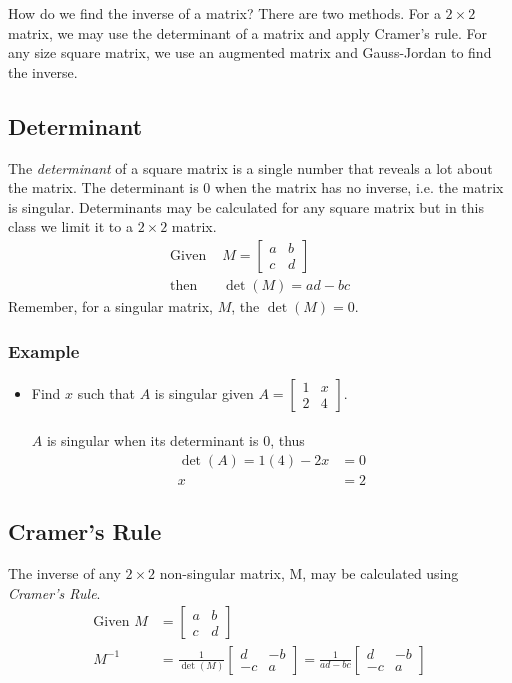 \documentclass[14pt]{extarticle}
\begin{document}
How do we find the inverse of a matrix? There are two methods. For a $2\times 2$ matrix, we may use the determinant of a matrix and apply Cramer's rule. For any size square matrix, we use an augmented matrix and Gauss-Jordan to find the inverse.

\subsection{Determinant}
The \textit{determinant} of a square matrix is a single number that reveals a lot about the matrix. The determinant is 0 when the matrix has no inverse, i.e. the matrix is singular. Determinants may be calculated for any square matrix but in this class we limit it to a $2\times 2$ matrix.
\begin{align*}
	\text{Given } &M = \begin{bmatrix}
		a & b \\
		c & d
	\end{bmatrix} \\
	\text{then } &\det(M) = ad-bc
\end{align*}
Remember, for a singular matrix, $M$, the $\det(M)=0$.

\subsubsection{Example}
\begin{itemize}
	\item Find $x$ such that $A$ is singular given $A=\begin{bmatrix} 1 & x \\ 2 & 4	\end{bmatrix}$.
	\\\\
	$A$ is singular when its determinant is $0$, thus
\begin{align*}
	\det(A) = 1(4) - 2x &= 0 \\
	x &= 2
\end{align*}
\end{itemize}

\subsection{Cramer's Rule}
The inverse of any $2\times 2$ non-singular matrix, M, may be calculated using \textit{Cramer's Rule}.
\begin{align*}
	\text{Given } M &= \begin{bmatrix}
		a & b \\
		c & d
	\end{bmatrix} \\
	M^{-1} &= \frac{1}{\det(M)} \begin{bmatrix}
		d & -b \\
		-c & a
	\end{bmatrix} = \frac{1}{ad-bc} \begin{bmatrix}
	d & -b \\
	-c & a
\end{bmatrix}
\end{align*}
\end{document}
